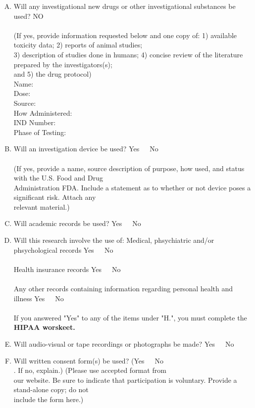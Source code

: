 \documentclass{article}
\newcommand{\no}{{\color{blue}NO}\\ }
\newcommand{\yn}{{Yes~~~No\\ }}
\begin{document}
\begin{enumerate}[I.]
\begin{enumerate}[A.]
        \item Will any investigational new drugs or other investigational
            substances be used? \no \\
        (If yes, provide information requested below and one copy of: 1) available toxicity data; 2) reports of animal studies;\\
        3) description of studies done in humans; 4) concise review of the literature prepared by the investigators(s); \\
        and 5) the drug protocol)\\

        Name:\\
        Dose: \\
        Source: \\
        How Administered: \\
        IND Number: \\
        Phase of Testing: \\

        \item Will an investigation device be used? \yn \\
        (If yes, provide a name, source description of purpose, how used, and status with the U.S. Food and Drug \\
        Administration FDA. Include a statement as to whether or not device poses a significant risk. Attach any \\
        relevant material.)

        \item Will academic records be used? \yn

        \item Will this research involve the use of:
        Medical, phsychiatric and/or phsychological records \yn \\
        Health insurance records \yn \\
        Any other records containing information regarding personal health and
        illness \yn \\

        If you answered "Yes" to any of the items under "H.", you must complete the \textbf{HIPAA worskeet.}\\

        \item Will audio-visual or tape recordings or photographs be made? \yn

        \item Will written consent form(s) be used? (\yn . If no, explain.) (Please use accepted format from \\
        our website. Be sure to indicate that participation is voluntary. Provide a stand-alone copy; do not \\
        include the form here.)


    \end{enumerate}
\end{enumerate}
\end{document}
